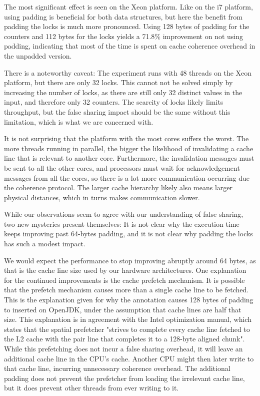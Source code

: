 The most significant effect is seen on the Xeon platform. Like on the i7
platform, using padding is beneficial for both data structures, but here the
benefit from padding the locks is much more pronounced. Using 128 bytes of
padding for the counters and 112 bytes for the locks yields a 71.8\% improvement
on not using padding, indicating that most of the time is spent on cache
coherence overhead in the unpadded version.

There is a noteworthy caveat: The experiment runs with 48 threads on the Xeon
platform, but there are only 32 locks.
This cannot not be solved simply by increasing the
number of locks, as there are still only 32 distinct values in the input, and
therefore only 32 counters.
The scarcity of locks likely limits
throughput, but the false sharing impact should be the same without
this limitation, which is what we are concerned with.

It is not surprising that the platform with the most cores suffers the worst.
The more threads running in parallel, the bigger the likelihood of invalidating
a cache line that is relevant to another core. Furthermore, the invalidation
messages must be sent to all the other cores, and processors must wait for
acknowledgement messages from all the cores, so there is a lot more
communication occurring due the coherence protocol. The larger cache hierarchy
likely also means larger physical distances, which in turns makes communication
slower.

While our observations seem to agree with our understanding of false sharing,
two new mysteries present themselves: It is not clear why the execution time
keeps improving past 64-bytes padding, and it is not clear why padding the locks
has such a modest impact.

We would expect the performance to stop improving abruptly around 64
bytes, as that is the cache line size used by our hardware architectures.
One explanation for the continued improvements is the cache prefetch mechanism.
It is possible that the prefetch mechanism causes more than a single cache line
to be fetched. This is the explanation given for why the 
annotation causes 128 bytes of padding to inserted on OpenJDK, under the
assumption that cache lines are half that size\cite{openjdkmailcontended}.
This explanation is in agreement with the Intel optimization
manual\cite{inteloptimize}, which states that the spatial prefetcher
"strives to complete every cache line fetched to the L2 cache with the pair line
that completes it to a 128-byte aligned chunk"\footnotemark. While this
prefetching does not incur a false sharing overhead, it will leave an additional
cache line in the CPU's cache. Another CPU might then later write to that
cache line, incurring unnecessary coherence overhead. The additional padding
does not prevent the prefetcher from loading the irrelevant cache line, but it
does prevent other threads from ever writing to it.

